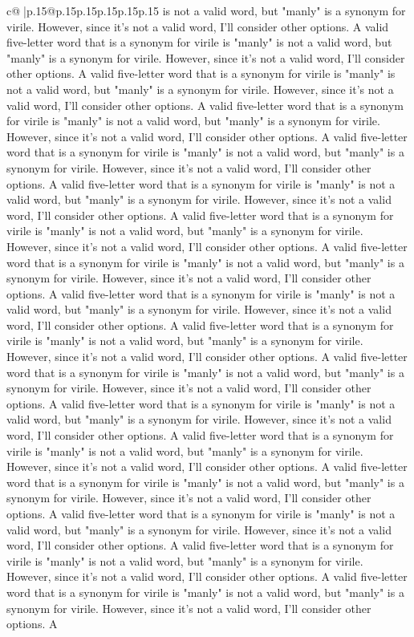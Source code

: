 \documentclass{article}
\begin{document}
{\begin{supertabular}{c@{$\;$}|p{.15\linewidth}@{}p{.15\linewidth}p{.15\linewidth}p{.15\linewidth}p{.15\linewidth}p{.15\linewidth}}
{{{is not a valid word, but "manly" is a synonym for virile. However, since it's not a valid word, I'll consider other options. A valid five{-}letter word that is a synonym for virile is "manly" is not a valid word, but "manly" is a synonym for virile. However, since it's not a valid word, I'll consider other options. A valid five{-}letter word that is a synonym for virile is "manly" is not a valid word, but "manly" is a synonym for virile. However, since it's not a valid word, I'll consider other options. A valid five{-}letter word that is a synonym for virile is "manly" is not a valid word, but "manly" is a synonym for virile. However, since it's not a valid word, I'll consider other options. A valid five{-}letter word that is a synonym for virile is "manly" is not a valid word, but "manly" is a synonym for virile. However, since it's not a valid word, I'll consider other options. A valid five{-}letter word that is a synonym for virile is "manly" is not a valid word, but "manly" is a synonym for virile. However, since it's not a valid word, I'll consider other options. A valid five{-}letter word that is a synonym for virile is "manly" is not a valid word, but "manly" is a synonym for virile. However, since it's not a valid word, I'll consider other options. A valid five{-}letter word that is a synonym for virile is "manly" is not a valid word, but "manly" is a synonym for virile. However, since it's not a valid word, I'll consider other options. A valid five{-}letter word that is a synonym for virile is "manly" is not a valid word, but "manly" is a synonym for virile. However, since it's not a valid word, I'll consider other options. A valid five{-}letter word that is a synonym for virile is "manly" is not a valid word, but "manly" is a synonym for virile. However, since it's not a valid word, I'll consider other options. A valid five{-}letter word that is a synonym for virile is "manly" is not a valid word, but "manly" is a synonym for virile. However, since it's not a valid word, I'll consider other options. A valid five{-}letter word that is a synonym for virile is "manly" is not a valid word, but "manly" is a synonym for virile. However, since it's not a valid word, I'll consider other options. A valid five{-}letter word that is a synonym for virile is "manly" is not a valid word, but "manly" is a synonym for virile. However, since it's not a valid word, I'll consider other options. A valid five{-}letter word that is a synonym for virile is "manly" is not a valid word, but "manly" is a synonym for virile. However, since it's not a valid word, I'll consider other options. A valid five{-}letter word that is a synonym for virile is "manly" is not a valid word, but "manly" is a synonym for virile. However, since it's not a valid word, I'll consider other options. A valid five{-}letter word that is a synonym for virile is "manly" is not a valid word, but "manly" is a synonym for virile. However, since it's not a valid word, I'll consider other options. A valid five{-}letter word that is a synonym for virile is "manly" is not a valid word, but "manly" is a synonym for virile. However, since it's not a valid word, I'll consider other options. A }}}
\end{supertabular}}
\end{document}
